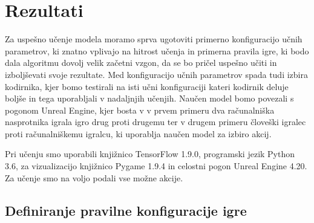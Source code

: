 \documentclass[a4paper, 12pt]{book}
\begin{document}
{%

\chapter{Rezultati}
\label{chrezultati}

Za uspešno učenje modela moramo sprva ugotoviti primerno konfiguracijo učnih parametrov, ki znatno vplivajo na hitrost učenja in primerna pravila igre, ki bodo dala algoritmu dovolj velik začetni vzgon, da se bo pričel uspešno učiti in izboljševati svoje rezultate.
Med konfiguracijo učnih parametrov spada tudi izbira kodirnika, kjer bomo testirali na isti učni konfiguraciji kateri kodirnik deluje boljše in tega uporabljali v nadaljnjih učenjih.
Naučen model bomo povezali s pogonom Unreal Engine, kjer bosta v v prvem primeru dva računalniška nasprotnika igrala igro drug proti drugemu ter v drugem primeru človeški igralec proti računalniškemu igralcu, ki uporablja naučen model za izbiro akcij.

Pri učenju smo uporabili knjižnico TensorFlow 1.9.0, programski jezik Python 3.6, za vizualizacijo knjižnico Pygame 1.9.4 in celostni pogon Unreal Engine 4.20.
Za učenje smo na voljo podali vse možne akcije.

\section{Definiranje pravilne konfiguracije igre}

}
\end{document}

